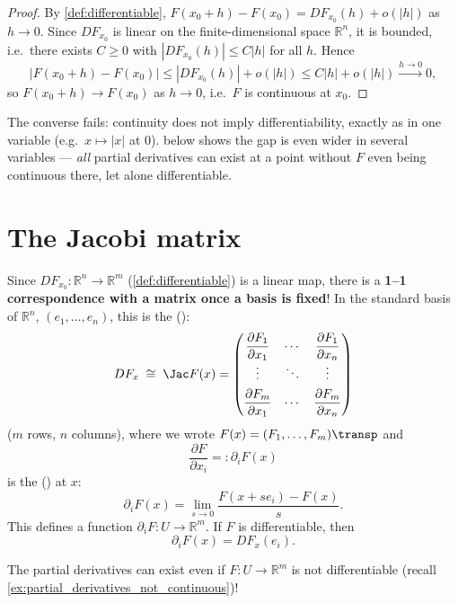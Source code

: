 \begin{proof}
By \cref{def:differentiable}, $F(x_0+h) - F(x_0) = DF_{x_0}(h) + o(|h|)$ as $h \to 0$. Since
$DF_{x_0}$ is linear on the finite-di\-men\-sional space $\mathbb{R}^n$, it is bounded, i.e.\ there
exists $C \geq 0$ with $|DF_{x_0}(h)| \leq C|h|$ for all $h$. Hence
\[|F(x_0+h) - F(x_0)| \leq |DF_{x_0}(h)| + o(|h|) \leq C|h| + o(|h|) \xrightarrow{h\to 0} 0,\]
so $F(x_0+h) \to F(x_0)$ as $h \to 0$, i.e.\ $F$ is continuous at $x_0$.
\end{proof}

\begin{remark}
The converse fails: continuity does not imply differentiability, exactly as in one variable
(e.g.\ $x \mapsto |x|$ at $0$).  below shows the
gap is even wider in several variables --- \emph{all} partial derivatives can exist at a point
without $F$ even being continuous there, let alone differentiable.
\end{remark}

\section{The Jacobi matrix}
\label{sec:jacobi_matrix}

Since $DF_{x_0} : \mathbb{R}^n \to \mathbb{R}^m$ (\cref{def:differentiable}) is a linear map, there is a \textbf{1--1
correspondence with a matrix once a basis is fixed}! In the standard basis of $\mathbb{R}^n$,
$(e_1,\dots,e_n)$, this is the  ():
\[DF_x \;\cong\; \Jac F(x) = \begin{pmatrix} \dfrac{\partial F_1}{\partial x_1} & \cdots & \dfrac{\partial F_1}{\partial x_n} \\[1ex] \vdots & \ddots & \vdots \\[1ex] \dfrac{\partial F_m}{\partial x_1} & \cdots & \dfrac{\partial F_m}{\partial x_n}\end{pmatrix}\]
($m$ rows, $n$ columns), where we wrote $F(x) = (F_1, \dots, F_m)\transp$ and
\[\frac{\partial F}{\partial x_i} =: \partial_i F(x)\]
is the  () at $x$:
\[\partial_i F(x) = \lim_{s\to 0}\frac{F(x+se_i)-F(x)}{s}.\]
This defines a function $\partial_i F : U \to \mathbb{R}^m$. If $F$ is differentiable, then
\[\partial_i F(x) = DF_x(e_i).\]

\begin{importantremark}
The partial derivatives can exist even if $F : U \to \mathbb{R}^m$ is not differentiable (recall \cref{ex:partial_derivatives_not_continuous})!
\end{importantremark}

